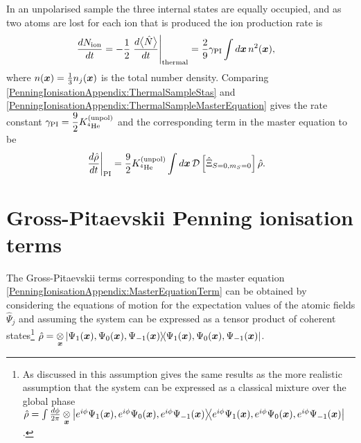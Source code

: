 In an unpolarised sample the three internal states are equally occupied, and as two atoms are lost for each ion that is produced the ion production rate is
\begin{align}
    \frac{d N_\text{ion}}{dt} &= -\frac{1}{2} \left.\frac{d \mean{\hat{N}}}{dt}\right|_\text{thermal} = \frac{2}{9} \gamma_\text{PI} \int d \vect{x}\, n^2(\vect{x}),
    \label{PenningIonisationAppendix:ThermalSampleMasterEquation}
\end{align}
where $n(\bm{x}) = \frac{1}{3}n_j(\bm{x})$ is the total number density.
Comparing \eqref{PenningIonisationAppendix:ThermalSampleStas} and \eqref{PenningIonisationAppendix:ThermalSampleMasterEquation}  gives the rate constant $\displaystyle\gamma_\text{PI} = \frac{9}{2} K^\text{(unpol)}_{^4\text{He}}$ and the corresponding term in the master equation to be
\begin{align}
    \label{PenningIonisationAppendix:MasterEquationTerm}
    \left.\frac{d \hat{\rho}}{dt}\right|_\text{PI} &= \frac{9}{2} \Kunpol \int d \vect{x}\, \mathcal{D}\left[ \hat{\Xi}_{S=0, m_S=0}\right] \hat{\rho}.
\end{align}

\section{Gross-Pitaevskii Penning ionisation terms}
\label{PenningIonisationAppendix:GP}

The Gross-Pitaevskii terms corresponding to the master equation \eqref{PenningIonisationAppendix:MasterEquationTerm} can be obtained by considering the equations of motion for the expectation values of the atomic fields $\hat{\Psi}_j$ and assuming the system can be expressed as a tensor product of coherent states\footnote{As discussed in  this assumption gives the same results as the more realistic assumption that the system can be expressed as a classical mixture over the global phase $\hat{\rho} = \int \frac{d\phi}{2\pi}\underset{\bm{x}}{\otimes} \left|e^{i\phi}\Psi_1(\bm{x}), e^{i\phi}\Psi_0(\bm{x}), e^{i\phi}\Psi_{-1}(\bm{x})\middle>\!\middle<e^{i\phi}\Psi_1(\bm{x}), e^{i\phi}\Psi_0(\bm{x}), e^{i\phi}\Psi_{-1}(\bm{x})\right|$.} $\displaystyle\hat{\rho} = \underset{\bm{x}}{\otimes} \left|\Psi_1(\bm{x}), \Psi_0(\bm{x}), \Psi_{-1}(\bm{x})\middle>\!\middle<\Psi_1(\bm{x}), \Psi_0(\bm{x}), \Psi_{-1}(\bm{x})\right|$.


